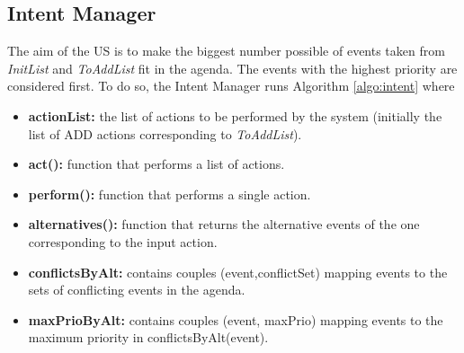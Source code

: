    \subsection{Intent Manager}
    \label{subsec:intentmanager}
    
    	The aim of the US is to make the biggest number possible of events taken from \textit{InitList} and \textit{ToAddList} fit in the agenda. The events with the highest priority are considered first. To do so, the Intent Manager runs Algorithm \ref{algo:intent} where
        
        
        \begin{itemize}
          \item \textbf{actionList:} the list of actions to be performed by the system (initially the list of ADD actions corresponding to \textit{ToAddList}).
          \item \textbf{act():} function that performs a list of actions.
          \item \textbf{perform():} function that performs a single action.
          \item \textbf{alternatives():} function that returns the alternative events of the one corresponding to the input action.
          \item \textbf{conflictsByAlt:} contains couples (event,conflictSet) mapping events to the sets of conflicting events in the agenda.
          \item \textbf{maxPrioByAlt:} contains couples (event, maxPrio) mapping events to the maximum priority in conflictsByAlt(event).
        \end{itemize}
			
